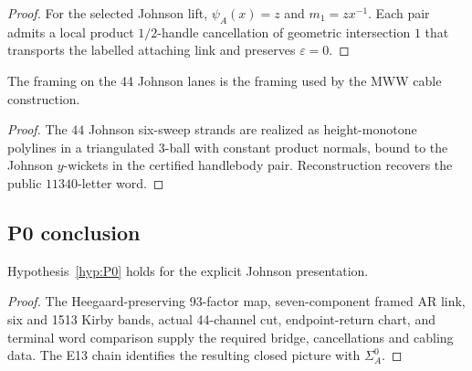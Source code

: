 \begin{proof}
For the selected Johnson lift, $\psi_A(x)=z$ and $m_1=zx^{-1}$.  Each pair
admits a local product $1/2$-handle cancellation of geometric intersection
$1$ that transports the labelled attaching link and preserves
$\varepsilon=0$.
\end{proof}

\begin{lemma}\label{lem:P0c}
The framing on the 44 Johnson lanes is the framing used by the MWW cable
construction.
\end{lemma}

\begin{proof}
The $44$ Johnson six-sweep strands are realized as height-monotone
polylines in a triangulated $3$-ball with constant product normals, bound to
the Johnson $y$-wickets in the certified handlebody pair.  Reconstruction
recovers the public $11340$-letter word.
\end{proof}

\subsection{P0 conclusion}\label{sec:p0-conclusion}

\begin{theorem}\label{thm:P0discharge}
Hypothesis~\ref{hyp:P0} holds for the explicit Johnson presentation.
\end{theorem}

\begin{proof}
The Heegaard-preserving 93-factor map, seven-component framed AR link, six and
1513 Kirby bands, actual 44-channel cut, endpoint-return chart, and terminal
word comparison supply the required bridge, cancellations and cabling data.
The E13 chain identifies the resulting closed picture with $\Sigma_A^0$.
\end{proof}

